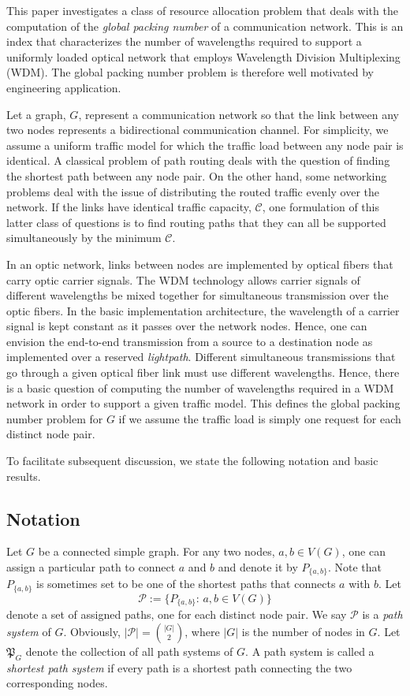 \documentclass[journal,draftcls,onecolumn,12pt,twoside]{IEEEtran}
\begin{document}
This paper investigates a class of resource allocation problem that deals with the computation of the {\em global packing number} of a communication network.  This
is an index that characterizes the number of wavelengths required to support a uniformly loaded optical network that employs Wavelength Division Multiplexing (WDM).  The global packing number problem is therefore well motivated by engineering application.

Let a graph, $G$, represent a communication network so that the link between any two nodes represents a bidirectional communication channel.  
For simplicity, we assume a uniform traffic model for which the
traffic load between any node pair is identical.   
A classical problem of path routing deals with the question of finding the shortest path between any node pair.   
On the other hand, some networking problems deal with the issue of distributing the routed traffic evenly over the network.   
If the links have identical traffic capacity, $\mathcal{C}$, one formulation of this latter class of questions is to find routing paths that they can all be supported simultaneously by the minimum $\mathcal{C}$. 
 
In an optic network, links between nodes are implemented by optical fibers that carry optic carrier signals.   
The WDM technology \cite{GY_04,LXC_05,S_10,SSA_02} allows carrier signals of different wavelengths be mixed together for simultaneous transmission over the optic fibers.  
In the basic implementation architecture, the wavelength of a carrier signal is kept constant as it passes over the network nodes.  
Hence, one can envision the end-to-end transmission from a source to a destination node as implemented over a reserved {\em lightpath}.  
Different simultaneous transmissions that go through a given optical fiber link must use different wavelengths.  
Hence, there is a basic question of computing the number of wavelengths required in a WDM network in order to support a given traffic model.  
This defines the global packing number problem for $G$ if we assume the traffic load
is simply one request for each distinct node pair. 
 
To facilitate subsequent discussion, we state the following notation and basic results.

\subsection{Notation} \label{sec:intro_notation}
Let $G$ be a connected simple graph. 
For any two nodes, $a,b\in V(G)$, one can assign a particular path to connect $a$ and $b$
and denote it by $P_{\{a,b\}}$.
Note that $P_{\{a,b\}}$ is sometimes set to be one of the shortest paths that connects $a$ with $b$.
Let $$\mathcal{P}:=\{P_{\{a,b\}}:\,a,b\in V(G)\}$$ denote a set of assigned paths,
one for each distinct node pair.
We say $\mathcal{P}$ is a \emph{path system} of $G$.
Obviously, $|\mathcal{P}|={|G|\choose 2}$, where $|G|$ is the number of nodes in $G$.
Let $\mathfrak{P}_G$ denote the collection of all path systems of $G$.
A path system is called a \emph{shortest path system} if every path is a shortest path connecting the two corresponding nodes.
\end{document}

